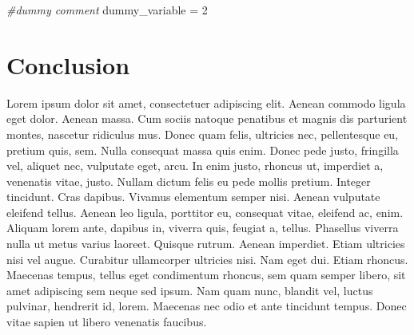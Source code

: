 \documentclass[]{book}
\newenvironment{Shaded}{\begin{snugshade}}{\end{snugshade}}
\newcommand{\DecValTok}[1]{\textcolor[rgb]{0.00,0.00,0.81}{#1}}
\newcommand{\StringTok}[1]{\textcolor[rgb]{0.31,0.60,0.02}{#1}}
\newcommand{\CommentTok}[1]{\textcolor[rgb]{0.56,0.35,0.01}{\textit{#1}}}
\newcommand{\NormalTok}[1]{#1}
\begin{document}
\begin{Shaded}
\begin{Highlighting}[]
\CommentTok{#dummy comment }
\NormalTok{dummy_variable =}\StringTok{ }\DecValTok{2}
\end{Highlighting}
\end{Shaded}

\chapter{Conclusion}\label{conclusion}

Lorem ipsum dolor sit amet, consectetuer adipiscing elit. Aenean commodo
ligula eget dolor. Aenean massa. Cum sociis natoque penatibus et magnis
dis parturient montes, nascetur ridiculus mus. Donec quam felis,
ultricies nec, pellentesque eu, pretium quis, sem. Nulla consequat massa
quis enim. Donec pede justo, fringilla vel, aliquet nec, vulputate eget,
arcu. In enim justo, rhoncus ut, imperdiet a, venenatis vitae, justo.
Nullam dictum felis eu pede mollis pretium. Integer tincidunt. Cras
dapibus. Vivamus elementum semper nisi. Aenean vulputate eleifend
tellus. Aenean leo ligula, porttitor eu, consequat vitae, eleifend ac,
enim. Aliquam lorem ante, dapibus in, viverra quis, feugiat a, tellus.
Phasellus viverra nulla ut metus varius laoreet. Quisque rutrum. Aenean
imperdiet. Etiam ultricies nisi vel augue. Curabitur ullamcorper
ultricies nisi. Nam eget dui. Etiam rhoncus. Maecenas tempus, tellus
eget condimentum rhoncus, sem quam semper libero, sit amet adipiscing
sem neque sed ipsum. Nam quam nunc, blandit vel, luctus pulvinar,
hendrerit id, lorem. Maecenas nec odio et ante tincidunt tempus. Donec
vitae sapien ut libero venenatis faucibus.


\end{document}
